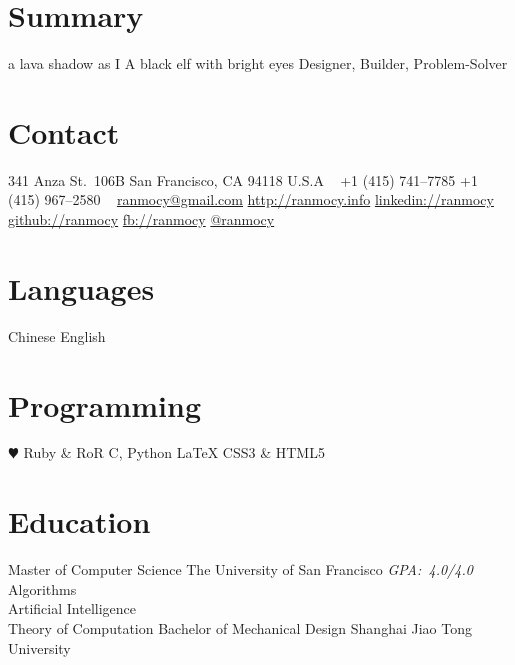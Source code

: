 \documentclass[]{friggeri-cv} %
\begin{document}


\begin{aside} %
  \section{Summary}
  a lava shadow as I
  A black elf
  with bright eyes
  Designer, Builder, Problem-Solver
  \section{Contact}
  341 Anza St.\ 106B
  San Francisco, CA 94118
  U.S.A
  ~
  +1 (415) 741--7785
  +1 (415) 967--2580
  ~
  \href{mailto:ranmocy@gmail.com}{ranmocy@gmail.com}
  \href{http://ranmocy.info}{http://ranmocy.info}
  \href{http://www.linkedin.com/in/ranmocy}{linkedin://ranmocy}
  \href{https://github.com/ranmocy}{github://ranmocy}
  \href{https://facebook.com/ranmocy}{fb://ranmocy}
  \href{https://twitter.com/ranmocy}{@ranmocy}
  \section{Languages}
  Chinese
  English
  \section{Programming}
  {\color{red} $\varheartsuit$} Ruby \& RoR
  C, Python
  LaTeX
  CSS3 \& HTML5
\end{aside}


\section{Education}

\begin{entrylist}
  {Master \textnormal{of Computer Science}}
  {The University of San Francisco}
  {
    \emph{GPA:~4.0/4.0}\\
    Algorithms\\
    Artificial Intelligence\\
    Theory of Computation
  }
  {Bachelor \textnormal{of Mechanical Design}}
  {Shanghai Jiao Tong University}
  {}
\end{entrylist}
\end{document}
